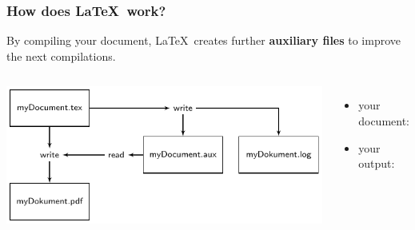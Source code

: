 \begin{frame}
\frametitle{How does \LaTeX\ work?}

By compiling your document, \LaTeX\ creates further \textbf{auxiliary files} to improve the next compilations.

\begin{columns}


\includegraphics[scale=.75]{../../texfiles-beamer/tex-material/WissArb-latex/LaTeX-flowchart-1.pdf}


\begin{itemize}
	\item your document: 
	\item your output: 
\end{itemize}

\end{columns}

\end{frame}


